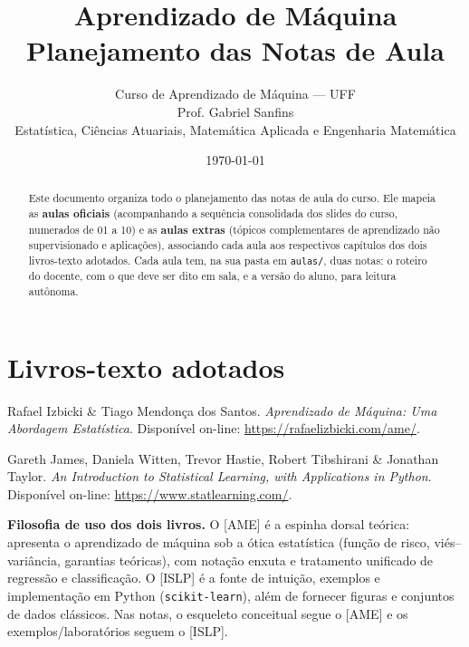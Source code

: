\documentclass[11pt,a4paper]{article}
\title{\textbf{Aprendizado de Máquina}\\[0.3em]
       \large Planejamento das Notas de Aula}
\author{Curso de Aprendizado de Máquina --- UFF\\
        \small Prof. Gabriel Sanfins\\
        \small Estatística, Ciências Atuariais, Matemática Aplicada e Engenharia Matemática}
\date{\today}
\begin{document}
\maketitle

\begin{abstract}
\noindent Este documento organiza todo o planejamento das notas de aula do curso.
Ele mapeia as \textbf{aulas oficiais} (acompanhando a sequência consolidada dos
slides do curso, numerados de 01 a 10) e as \textbf{aulas extras} (tópicos
complementares de aprendizado não supervisionado e aplicações), associando cada
aula aos respectivos capítulos dos dois livros-texto adotados. Cada aula tem, na
sua pasta em \texttt{aulas/}, duas notas: o roteiro do docente, com o que deve ser
dito em sala, e a versão do aluno, para leitura autônoma.
\end{abstract}

\section{Livros-texto adotados}
\begin{description}[leftmargin=2.2cm,style=nextline]
  \item[\textbf{[AME]}] Rafael Izbicki \& Tiago Mendonça dos Santos.
        \emph{Aprendizado de Máquina: Uma Abordagem Estatística}.
        Disponível on-line: \url{https://rafaelizbicki.com/ame/}.
  \item[\textbf{[ISLP]}] Gareth James, Daniela Witten, Trevor Hastie,
        Robert Tibshirani \& Jonathan Taylor.
        \emph{An Introduction to Statistical Learning, with Applications in Python}.
        Disponível on-line: \url{https://www.statlearning.com/}.
\end{description}

\noindent\textbf{Filosofia de uso dos dois livros.}
O [AME] é a espinha dorsal teórica: apresenta o aprendizado de máquina sob a ótica
estatística (função de risco, viés--variância, garantias teóricas), com notação
enxuta e tratamento unificado de regressão e classificação. O [ISLP] é a fonte de
intuição, exemplos e implementação em Python (\texttt{scikit-learn}), além de
fornecer figuras e conjuntos de dados clássicos. Nas notas, o esqueleto conceitual
segue o [AME] e os exemplos/laboratórios seguem o [ISLP].

\end{document}
